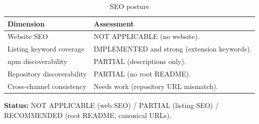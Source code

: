 \begin{table}[H]
\centering
\caption{SEO posture}
\begin{tabular}{p{4.6cm}p{9.6cm}}
\toprule
\textbf{Dimension} & \textbf{Assessment} \\
\midrule
Website SEO & NOT APPLICABLE (no website). \\
Listing keyword coverage & IMPLEMENTED and strong (extension keywords). \\
npm discoverability & PARTIAL (descriptions only). \\
Repository discoverability & PARTIAL (no root README). \\
Cross-channel consistency & Needs work (repository URL mismatch). \\
\bottomrule
\end{tabular}
\end{table}

\textbf{Status:} NOT APPLICABLE (web SEO) / PARTIAL (listing SEO) / RECOMMENDED
(root README, canonical URLs).
